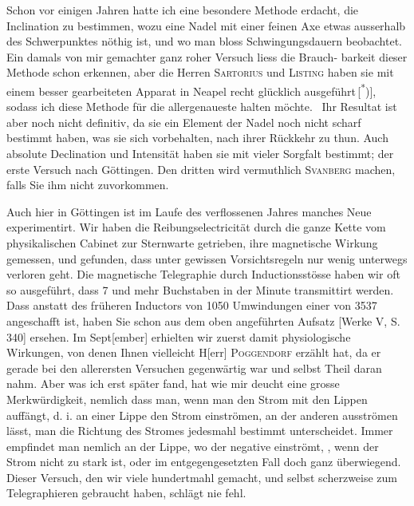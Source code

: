 Schon vor einigen Jahren hatte ich eine besondere Methode erdacht, die
Inclination zu bestimmen, wozu eine Nadel mit einer feinen Axe etwas ausserhalb
des Schwerpunktes nöthig ist, und wo man bloss Schwingungsdauern beobachtet.
Ein damals von mir gemachter ganz roher Versuch liess die Brauch-
\clearpage{}
\noindent barkeit dieser Methode schon erkennen, aber die Herren \textsc{Sartorius} und \textsc{Listing}
haben sie mit einem besser gearbeiteten Apparat in Neapel recht glücklich
ausgeführt\,[\textsuperscript{*})], sodass ich diese Methode für die allergenaueste halten möchte.\begingroup\renewcommand{\thefootnote}{}
\endgroup\ Ihr Resultat ist aber noch nicht definitiv, da sie ein Element der Nadel noch
nicht scharf bestimmt haben, was sie sich vorbehalten, nach ihrer Rückkehr
zu thun. Auch absolute Declination und Intensität haben sie mit vieler Sorgfalt
bestimmt; der erste Versuch nach Göttingen. Den dritten wird vermuthlich
\textsc{Svanberg} machen, falls Sie ihm nicht zuvorkommen.

Auch hier in Göttingen ist im Laufe des verflossenen Jahres manches
Neue experimentirt. Wir haben die Reibungselectricität durch die ganze
Kette vom physikalischen Cabinet zur Sternwarte getrieben, ihre magnetische
Wirkung gemessen, und gefunden, dass unter gewissen Vorsichtsregeln nur
wenig unterwegs verloren geht. Die magnetische Telegraphie durch Inductionsstösse
haben wir oft so ausgeführt, dass 7 und mehr Buchstaben in der Minute
transmittirt werden. Dass anstatt des früheren Inductors von 1050 Umwindungen
einer von 3537 angeschafft ist, haben Sie schon aus dem oben angeführten
Aufsatz [Werke V, S. 340] ersehen. Im Sept[ember] erhielten wir zuerst damit
physiologische Wirkungen, von denen Ihnen vielleicht H[err] \textsc{Poggendorf} erzählt
hat, da er gerade bei den allerersten Versuchen gegenwärtig war und selbst
Theil daran nahm. Aber was ich erst später fand, hat wie mir deucht eine
grosse Merkwürdigkeit, nemlich dass man, wenn man den Strom mit den Lippen
auffängt, d. i. an einer Lippe den Strom einströmen, an der anderen ausströmen
lässt, man die Richtung des Stromes jedesmahl bestimmt unterscheidet.
Immer empfindet man nemlich an der Lippe, wo der negative einströmt,
, wenn der Strom nicht zu stark ist, oder im entgegengesetzten Fall
doch ganz überwiegend. Dieser Versuch, den wir viele hundertmahl gemacht,
und selbst scherzweise zum Telegraphieren gebraucht haben, schlägt nie fehl.


